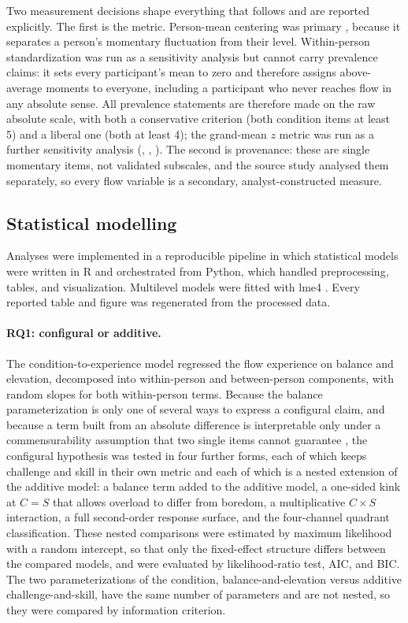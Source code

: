 \documentclass[11pt,a4paper]{article}
\begin{document}
Two measurement decisions shape everything that follows and are reported explicitly. The first is
the metric. Person-mean centering was primary \citep{curran2011disaggregation}, because it
separates a person's momentary fluctuation from their level. Within-person standardization was
run as a sensitivity analysis but cannot carry prevalence claims: it sets every participant's mean
to zero and therefore assigns above-average moments to everyone, including a participant who never
reaches flow in any absolute sense. All prevalence statements are therefore made on the raw
absolute scale, with both a conservative criterion (both condition items at least 5) and a liberal
one (both at least 4); the grand-mean $z$ metric was run as a further sensitivity analysis
(, , ). The
second is provenance: these are single momentary items, not validated subscales, and the source
study analysed them separately, so every flow variable is a secondary, analyst-constructed measure.

\subsection{Statistical modelling}
Analyses were implemented in a reproducible pipeline in which statistical models were written in
\textsf{R} \citep{rcoreteam2024} and orchestrated from \textsf{Python}, which handled
preprocessing, tables, and visualization. Multilevel models were fitted with \textsf{lme4}
\citep{bates2015lme4}. Every reported table and figure was regenerated from the processed data.

\paragraph{RQ1: configural or additive.} The condition-to-experience model regressed the flow
experience on balance and elevation, decomposed into within-person and between-person components,
with random slopes for both within-person terms. Because the balance parameterization is only one
of several ways to express a configural claim, and because a term built from an absolute
difference is interpretable only under a commensurability assumption that two single items cannot
guarantee \citep{edwards1993polynomial,edwards1994congruence}, the configural hypothesis was
tested in four further forms, each of which keeps challenge and skill in their own metric and each
of which is a nested extension of the additive model: a balance term added to the additive model,
a one-sided kink at $C=S$ that allows overload to differ from boredom, a multiplicative
$C \times S$ interaction, a full second-order response surface, and the four-channel quadrant
classification. These nested comparisons were estimated by maximum likelihood with a random
intercept, so that only the fixed-effect structure differs between the compared models, and were
evaluated by likelihood-ratio test, AIC, and BIC. The two parameterizations of the condition,
balance-and-elevation versus additive challenge-and-skill, have the same number of parameters and
are not nested, so they were compared by information criterion.
\end{document}
